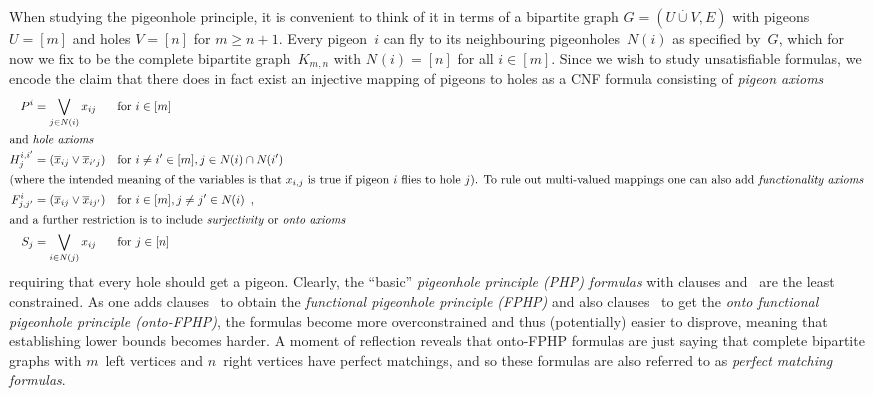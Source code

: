 \documentclass{article}
\newcommand{\intersection}{\cap}
\newcommand{\disjointunion}{\overset{.}{\cup}}
\newcommand{\Lor}{\bigvee}
\newcommand{\olnot}[1]{\overline{#1}}
\newcommand{\introduceterm}[1]{{\emph{#1}}}
\newcommand{\eqcomma}{\enspace ,}
\newcommand{\pigeonclause}[1]{P^{#1}}
\newcommand{\holeclause}[3]{H^{#1,#2}_{#3}}
\newcommand{\functionclause}[3]{F^{#1}_{#2,#3}}
\newcommand{\ontoclause}[1]{S_{#1}}
\newcommand{\neigh}[2][]{N_{{#1}}(#2)}
\numberwithin{equation}{section}
\begin{document}
When studying the pigeonhole principle,
it is convenient to think of it in terms of a bipartite graph
$G = (U \disjointunion  V, E)$  with 
pigeons $U = [m]$ and holes $V = [n]$ for
$m \geq n+1$.
Every pigeon~$i$ can fly to its neighbouring pigeonholes~$N(i)$ as
specified 
by~$G$,
which for now we 
fix to be the 
complete bipartite graph~$K_{m,n}$ with $\neigh{i} = [n]$ for all $i \in [m]$.
Since we wish to study unsatisfiable formulas, 
we encode the claim that there does in fact exist an injective
mapping of pigeons to holes as a CNF formula consisting of
\introduceterm{pigeon axioms}
\begin{subequations}
\begin{align}
  \label{eq:axiom-pigeon}
  \pigeonclause{i}
  &= \Lor_{j \in 
    \neigh{i}
    } x_{ij} 
  &&\text{for } i \in [m]
  \\
\shortintertext{and \introduceterm{hole axioms}}
  \label{eq:axiom-hole}
  \holeclause{i}{i'}{j}
  &= (\olnot{x}_{ij} \vee \olnot{x}_{i'j}) 
  &&\text{for }i \neq i' \in [m], j \in \neigh{i} \intersection \neigh{i'} 
  \\
\intertext{(where the intended meaning of the variables is that
  $x_{i,j}$ is true if pigeon~$i$ flies to hole~$j$).
  To rule out multi-valued mappings one can also add
  \introduceterm{functionality axioms}
}
  \label{eq:axiom-functionality}
  \functionclause{i}{j}{j'}
    &= (\olnot{x}_{ij} \vee \olnot{x}_{ij'}) 
  &&\text{for }i \in [m], j \neq j' \in \neigh{i} \eqcomma\\
  \intertext{and a further restriction is to include
  \introduceterm{surjectivity} or
  \introduceterm{onto axioms}
}
  \label{eq:axiom-onto}
  \ontoclause{j}
  &= \Lor_{i \in 
    \neigh{j}
    } x_{ij} 
  &&\text{for } j \in [n] 
\end{align}
\end{subequations}
requiring that every hole should get a pigeon.
Clearly, the ``basic''
\introduceterm{pigeonhole principle (PHP) formulas}
with clauses
 and~
are the least constrained.
As one adds clauses~ to obtain
the
\introduceterm{functional pigeonhole principle (FPHP)}
and also clauses~ to get
the
\introduceterm{onto functional pigeonhole principle (onto-FPHP)},
the formulas become more overconstrained and thus (potentially) easier
to disprove, meaning that establishing lower bounds becomes harder.
A moment of reflection reveals that onto-FPHP formulas are just saying
that complete bipartite graphs with $m$~left vertices and
$n$~right vertices have perfect matchings, and so these formulas are
also referred to as
\introduceterm{perfect matching formulas}.
\end{document}
